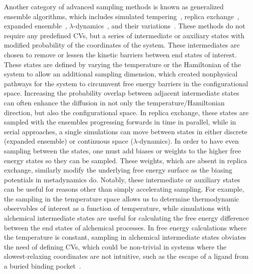 \documentclass[journal=jacsat,manuscript=article]{achemso}
\begin{document}
Another category of advanced sampling methods is known as generalized ensemble algorithms, which includes simulated tempering~\cite{marinari1992simulated}, replica exchange~\cite{TREMD, HREMD}, expanded ensemble~\cite{EXE}, $\lambda$-dynamics~\cite{knight2009lambda}, and their variations~\cite{oshima2019replica, knight2011multisite}. These methods do not require any predefined CVs, but a series of intermediate or auxiliary states with modified probability of the coordinates of the system. These intermediates are chosen to remove or lessen the kinetic barriers between end states of interest. These states are defined by varying the temperature or the Hamiltonian of the system to allow an additional sampling dimension, which created nonphysical pathways for the system to circumvent free energy barriers in the configurational space. Increasing the probability overlap between adjacent intermediate states can often enhance the diffusion in not only the temperature/Hamiltonian direction, but also the configurational space. In replica exchange, these states are sampled with the ensembles progressing forwards in time in parallel, while in serial approaches, a single simulations can move between states in either discrete (expanded ensemble) or continuous space ($\lambda$-dynamics). In order to have even sampling between the states, one must add biases or weights to the higher free energy states so they can be sampled. These weights, which are absent in replica exchange, similarly modify the underlying free energy surface as the biasing potentials in metadynamics do. Notably, these intermediate or auxiliary states can be useful for reasons other than simply accelerating sampling. For example, the sampling in the temperature space allows us to determine thermodynamic observables of interest as a function of temperature, while simulations with alchemical intermediate states are useful for calculating the free energy difference between the end states of alchemical processes. In free energy calculations where the temperature is constant, sampling in alchemical intermediate states obviates the need of defining CVs, which could be non-trivial in systems where the slowest-relaxing coordinates are not intuitive, such as the escape of a ligand from a buried binding pocket~\cite{buried1, buried2}. 
\end{document}
